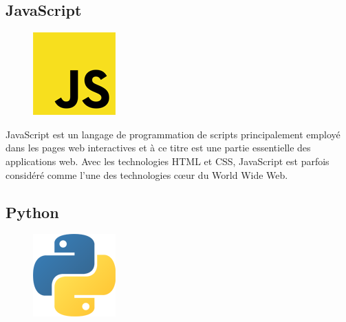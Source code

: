 \clearpage        
    
\subsection{JavaScript}
    \begin{figure}
        \vspace{-22pt}
        \begin{center}
              \includegraphics[scale=0.36]{images/logo/js.png}
              \label{fig73}
        \end{center}
        \vspace{-20pt}
        \vspace{-10pt}
    \end{figure}

JavaScript est un langage de programmation de scripts principalement employé 
dans les pages web interactives et à ce titre est une partie essentielle des 
applications web. Avec les technologies HTML et CSS, JavaScript est parfois 
considéré comme l'une des technologies cœur du World Wide Web\cite{16}.     
        
\subsection{Python}
    \begin{figure}
        \vspace{-22pt}
        \begin{center}
            \includegraphics[scale=0.36]{images/logo/python.png}
            \label{fig74}
        \end{center}
        \vspace{-20pt}
        \vspace{-10pt}
    \end{figure}

